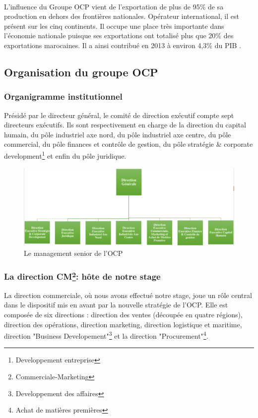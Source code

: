 		\paragraph{}
		L’influence du Groupe OCP vient de l’exportation de plus de 95\% de sa production en dehors
		des frontières nationales. Opérateur international, il est présent sur les cinq continents. Il occupe
		une place très importante dans l'économie nationale puisque ses exportations ont totalisé plus
		que 20\% des exportations marocaines. Il a ainsi contribué en 2013 à environ 4,3\% du PIB \cite{CHEMLAL}.
		\subsection{Organisation du groupe OCP}
		\subsubsection{Organigramme institutionnel}
		Présidé par le directeur général, le comité de direction exécutif compte sept directeurs exécutifs.
		Ils sont respectivement en charge de la direction du capital humain, du pôle industriel axe nord,
		du pôle industriel axe centre, du pôle commercial, du pôle finances et contrôle de gestion, du
		pôle stratégie \& corporate development\footnote{Developpement entreprise} et enfin du pôle juridique.
		\begin{figure}[H]
		    		\centering
		    		\includegraphics[scale=0.35]{Orga}
		    		\caption{Le management senior de l'OCP \cite{ocp-fil}}
		    		\label{fig:Orga}
			\end{figure}
		\subsubsection{La direction CM\protect\footnote{Commerciale-Marketing}: hôte de notre stage}
		La direction commerciale, où nous avons effectué notre stage, joue un rôle central dans le dispositif mis
		en avant par la nouvelle stratégie de l'OCP. Elle est composée de six directions : direction des
		ventes (découpée en quatre régions), direction des opérations, direction marketing, direction
		logistique et maritime, direction "Business Developement"\footnote{Developpement des affaires} et la direction "Procurement"\footnote{Achat de matières
		premières}.
